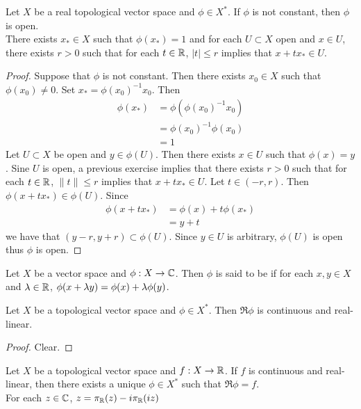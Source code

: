 \documentclass{book}
\begin{document}
	\begin{ex}
		Let $X$ be a real topological vector space and $\phi \in X^*$. If $\phi$ is not constant, then $\phi$ is open. \\
		 There exists $x_* \in X$  such that $\phi(x_*) = 1$ and for each $U \subset X$ open and $x \in U$, there exists $r >0$ such that for each $t \in \mathbb{R}$, $|t| \leq r$ implies that $x + tx_* \in U$. 
	\end{ex}
	
	\begin{proof}
		Suppose that $\phi$ is not constant. Then there exists $x_0 \in X$ such that $\phi(x_0) \neq 0$. Set $x_* = \phi(x_0)^{-1} x_0$. Then
		\begin{align*}
			\phi(x_*)
			&= \phi(\phi(x_0)^{-1}x_0) \\
			&= \phi(x_0)^{-1}\phi(x_0) \\
			&= 1
		\end{align*}
		Let $U \subset X$ be open and $y \in \phi(U)$. Then there exists $x \in U$ such that $\phi(x) = y$. Sine $U$ is open, a previous exercise implies that there exists $r > 0$ such that for each $t \in \mathbb{R}$, $\|t\| \leq r$ implies that $x + tx_* \in U$. Let $t \in (-r, r)$. Then $\phi(x+ tx_*) \in \phi(U)$. Since 
		\begin{align*}
			\phi(x+ tx_*) 
			&= \phi(x) + t\phi(x_*) \\
			&= y + t
		\end{align*}
	we have that $(y-r, y+r) \subset \phi(U)$. Since $y \in U$ is arbitrary, $\phi(U)$ is open thus $\phi$ is open. 
	\end{proof}

	\begin{defn}
		Let $X$ be a vector space and $\phi: X \rightarrow \mathbb{C}$. Then $\phi$ is said to be  if for each $x,y \in X$ and $\lambda \in \mathbb{R}$, $\phi(x+ \lambda y) = \phi(x) + \lambda \phi(y)$.
	\end{defn}

	\begin{ex}
		Let $X$ be a topological vector space and $\phi \in X^*$. Then $\Re \phi$ is continuous and real-linear. 
	\end{ex}

	\begin{proof}
		Clear.
	\end{proof}

	\begin{ex}
		Let $X$ be a topological vector space and $f:X \rightarrow \mathbb{R}$. If $f$ is continuous and real-linear, then there exists a unique $\phi \in X^*$ such that $\Re \phi = f$. \\
		 For each $z \in \mathbb{C}$, $z = \pi_{\mathbb{R}}(z) - i \pi_{\mathbb{R}}(iz)$
	\end{ex}
	
\end{document}
